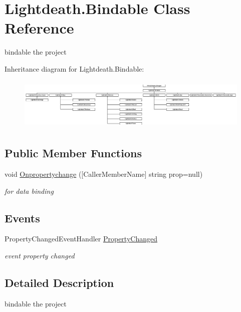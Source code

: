 \hypertarget{class_lightdeath_1_1_bindable}{}\section{Lightdeath.\+Bindable Class Reference}
\label{class_lightdeath_1_1_bindable}


bindable the project  


Inheritance diagram for Lightdeath.\+Bindable\+:\begin{figure}[H]
\begin{center}
\leavevmode
\includegraphics[height=2.533937cm]{class_lightdeath_1_1_bindable}
\end{center}
\end{figure}
\subsection*{Public Member Functions}
\begin{DoxyCompactItemize}
\item 
void \hyperlink{class_lightdeath_1_1_bindable_ac19b61f339d114e87184fae59a22ab6b}{Onpropertychange} (\mbox{[}Caller\+Member\+Name\mbox{]} string prop=null)
\begin{DoxyCompactList}\small\item\em for data binding \end{DoxyCompactList}\end{DoxyCompactItemize}
\subsection*{Events}
\begin{DoxyCompactItemize}
\item 
Property\+Changed\+Event\+Handler \hyperlink{class_lightdeath_1_1_bindable_a8dedf7959b9b43853db7b3ee7e98b38e}{Property\+Changed}
\begin{DoxyCompactList}\small\item\em event property changed \end{DoxyCompactList}\end{DoxyCompactItemize}


\subsection{Detailed Description}
bindable the project 



